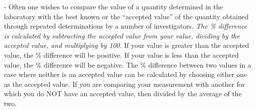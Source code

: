  - Often one wishes to compare the value of a quantity
determined in the laboratory with the best known or the ``accepted value''
of the quantity obtained through repeated determinations by a number of investigators.
\textit{The \% difference is calculated by subtracting the accepted value from
your value, dividing by the accepted value, and multiplying by 100.} If your
value is greater than the accepted value, the \% difference will be positive.
If your value is less than the accepted value, the \% difference will be negative.
The \% difference between two values in a case where neither is an accepted
value can be calculated by choosing either one as the accepted value.
If you are comparing your measurement with another for which you do NOT have an accepted value,
then divided by the average of the two.

